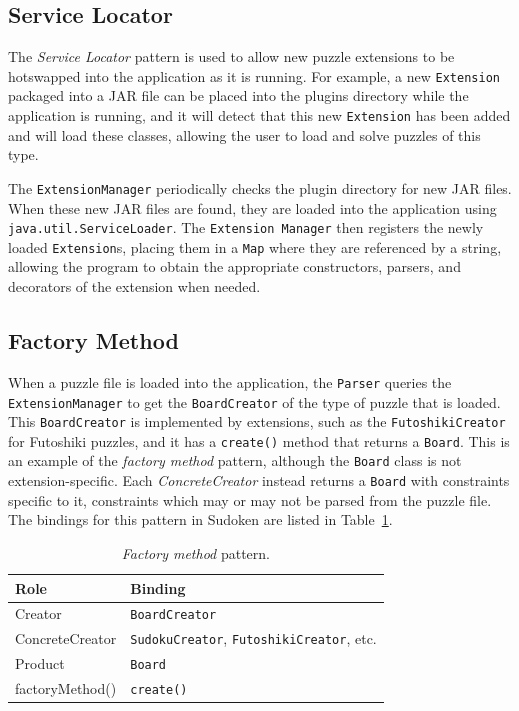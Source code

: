 \documentclass[a4paper, 11pt]{article}
\begin{document}
\subsection{Service Locator}

The \textit{Service Locator} pattern is used to allow new puzzle extensions to be hotswapped into the application as it is running. For example, a new \texttt{Extension} packaged into a JAR file can be placed into the plugins directory while the application is running, and it will detect that this new \texttt{Extension} has been added and will load these classes, allowing the user to load and solve puzzles of this type.

The \texttt{ExtensionManager} periodically checks the plugin directory for new JAR files. When these new JAR files are found, they are loaded into the application using \texttt{java.util.ServiceLoader}. The \texttt{Extension Manager} then registers the newly loaded \texttt{Extension}s, placing them in a \texttt{Map} where they are referenced by a string, allowing the program to obtain the appropriate constructors, parsers, and decorators of the extension when needed.

\subsection{Factory Method}

When a puzzle file is loaded into the application, the \texttt{Parser} queries the \texttt{ExtensionManager} to get the \texttt{BoardCreator} of the type of puzzle that is loaded. This \texttt{BoardCreator} is implemented by extensions, such as the \texttt{FutoshikiCreator} for Futoshiki puzzles, and it has a \texttt{create()} method that returns a \texttt{Board}. This is an example of the \textit{factory method} pattern, although the \texttt{Board} class is not extension-specific. Each \textit{ConcreteCreator} instead returns a \texttt{Board} with constraints specific to it, constraints which may or may not be parsed from the puzzle file. The bindings for this pattern in Sudoken are listed in Table~\ref{table:factory}.

\begin{table}[h!]
\centering
\begin{tabular}{l l}
\textbf{Role}   & \textbf{Binding} \\ \hline
Creator         & \texttt{BoardCreator} \\
ConcreteCreator & \texttt{SudokuCreator}, \texttt{FutoshikiCreator}, etc. \\
Product         & \texttt{Board} \\
factoryMethod() & \texttt{create()} \\
\end{tabular}
\caption{\textit{Factory method} pattern.}
\label{table:factory}
\end{table}
\end{document}
